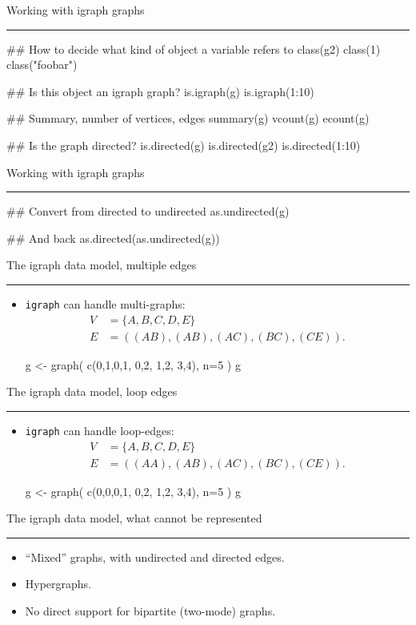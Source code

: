 \documentclass[landscape,fleqno]{foils}
\newcommand{\stitle}[1]{{\color{blue}\Large #1\par\vspace*{10pt}\hrule}}
\newcommand{\igraph}{\texttt{{igraph}}\xspace}
\newenvironment{narrow}[2]{%
  \begin{list}{}{%
      \setlength{\topsep}{0pt}%
      \setlength{\leftmargin}{#1}%
      \setlength{\rightmargin}{#2}%
      \setlength{\listparindent}{\parindent}%
      \setlength{\itemindent}{\parindent}%
      \setlength{\parsep}{\parskip}}%
    \item[]}{\end{list}}
\begin{document}
\newpage
\stitle{Working with igraph graphs}
\begin{Myverb}
  ## How to decide what kind of object a variable refers to
  class(g2)
  class(1)
  class("foobar")

  ## Is this object an igraph graph?
  is.igraph(g)
  is.igraph(1:10)

  ## Summary, number of vertices, edges
  summary(g)
  vcount(g)
  ecount(g)

  ## Is the graph directed?
  is.directed(g)
  is.directed(g2)
  is.directed(1:10)
\end{Myverb}

\newpage
\stitle{Working with igraph graphs}
\begin{Myverb}
  ## Convert from directed to undirected
  as.undirected(g)

  ## And back
  as.directed(as.undirected(g))
\end{Myverb}

\newpage
\stitle{The igraph data model, multiple edges}
\begin{narrow}{0cm}{15cm}
\begin{itemize}
\item \igraph can handle multi-graphs:
  \begin{align} 
    V & =\{A,B,C,D,E\} \nonumber\\
    E & =( (AB),(AB),(AC),(BC),(CE) ). \nonumber
  \end{align}
  \begin{Myverb}
  g <- graph( c(0,1,0,1, 0,2, 1,2, 3,4), n=5 )
  g
  \end{Myverb}
\end{itemize}
\end{narrow}

\newpage
\stitle{The igraph data model, loop edges}
\begin{narrow}{0cm}{15cm}
\begin{itemize}
\item \igraph can handle loop-edges:
  \begin{align} 
    V & =\{A,B,C,D,E\} \nonumber\\
    E & =( (AA),(AB),(AC),(BC),(CE) ). \nonumber
  \end{align}
  \begin{Myverb}
  g <- graph( c(0,0,0,1, 0,2, 1,2, 3,4), n=5 )
  g
  \end{Myverb}
\end{itemize}
\end{narrow}

\newpage
\stitle{The igraph data model, what cannot be represented}
\begin{itemize}
\item ``Mixed'' graphs, with undirected and directed edges.
\item Hypergraphs.
\item No direct support for bipartite (two-mode) graphs.
\end{itemize}
\end{document}
